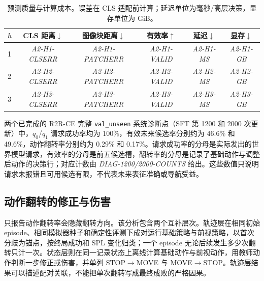 \documentclass[UTF8,11pt]{ctexart}
\begin{document}
\begin{table}[t]
\centering
\caption{预测质量与计算成本。误差在 CLS 适配前计算；延迟单位为毫秒/高层决策，显存单位为 GiB。}
\label{tab:horizon-cost}
\begin{tabular}{lccccc}
\toprule
$h$ & CLS 距离$\downarrow$ & 图像块距离$\downarrow$ & 有效率$\uparrow$ & 延迟$\downarrow$ & 显存$\downarrow$ \\
\midrule
1 & \textit{A2-H1-CLSERR} & \textit{A2-H1-PATCHERR} & \textit{A2-H1-VALID} & \textit{A2-H1-MS} & \textit{A2-H1-GB} \\
2 & \textit{A2-H2-CLSERR} & \textit{A2-H2-PATCHERR} & \textit{A2-H2-VALID} & \textit{A2-H2-MS} & \textit{A2-H2-GB} \\
3 & \textit{A2-H3-CLSERR} & \textit{A2-H3-PATCHERR} & \textit{A2-H3-VALID} & \textit{A2-H3-MS} & \textit{A2-H3-GB} \\
\bottomrule
\end{tabular}
\end{table}

两个已完成的 R2R-CE 完整 \texttt{val\_unseen} 系统诊断点（SFT 第 1200 和 2000 次更新）中，$q_0$/$q_1$ 请求成功率均为 100\%，有效未来候选率分别约为 46.6\% 和 49.6\%，动作翻转率分别约为 0.29\% 和 0.17\%。请求成功率的分母是实际发出的世界模型请求，有效率的分母是前五候选槽，翻转率的分母是记录了基础动作与调整后动作的决策行；对应计数由 \textit{DIAG-1200/2000-COUNTS} 给出。这些数值只说明请求未报错且可用候选有限，不代表未来表征准确或导航受益。

\subsection{动作翻转的修正与伤害}

只报告动作翻转率会隐藏翻转方向。该分析包含两个互补层次。轨迹层在相同初始 episode、相同模拟器种子和确定性评测下成对运行基础策略与前视策略，以首次分歧为锚点，按终局成功和 SPL 变化归类；一个 episode 无论后续发生多少次翻转只计一次。状态层则在同一记录状态上离线计算基础动作与前视动作，用教师动作判断一步修正或伤害，并单列 STOP$\rightarrow$MOVE 与 MOVE$\rightarrow$STOP。轨迹层结果可以描述配对关联，不能把单次翻转写成最终成败的严格因果。
\end{document}
